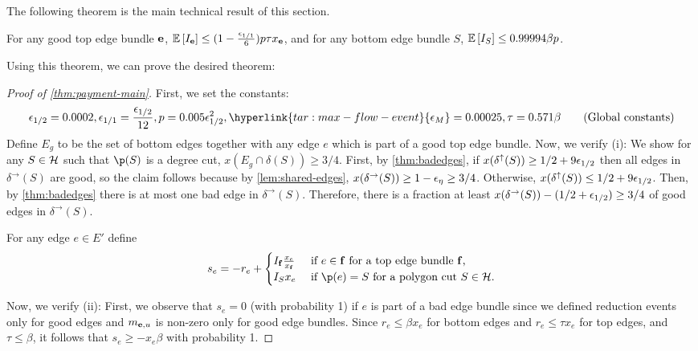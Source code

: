 The following theorem is the main technical result of this section.
\begin{theorem}\label{thm:expI}
For any good top edge bundle ${\bf e}$, 	
${\mathbb{E}}\left[I_{\bf e}\right] \le (1-\frac{{\epsilon}_{1/1}}{6})p\tau x_{\bf e}$,
and for any bottom edge bundle $S$,
${\mathbb{E}}\left[I_S\right] \le 0.99994 \beta p$.
\end{theorem}
Using this theorem, we can prove the desired theorem: 
\paymentmain*
\begin{proof}[Proof of \cref{thm:payment-main}]
First, we set the constants: 
\begin{align}\label{eq:constants}
\eps_{1/2}=0.0002, \eps_{1/1}=\frac{\eps_{1/2}}{12}, p=0.005\eps_{1/2}^2, \hyperlink{tar:max-flow-event}{\eps_M}=0.00025, \tau=0.571\beta \tag{Global constants} %
\end{align}
Define $E_g$ to be the set of bottom edges together
with any edge $e$ which is part of a good top edge bundle. Now, we verify (i): We show for any $S\in \mathcal{H}$ such that $\p(S)$ is a degree cut, $x(E_g\cap \delta(S))\geq 3/4$. 
First, by \cref{thm:badedges}, if $x(\delta^\uparrow(S))\geq 1/2+9{\epsilon}_{1/2}$ then all edges in $\delta^\rightarrow(S)$ are good, so the claim follows because by \cref{lem:shared-edges}, $x(\delta^\rightarrow(S))\geq 1-{\epsilon}_\eta\geq 3/4$. Otherwise, $x(\delta^\uparrow(S))\leq 1/2+9{\epsilon}_{1/2}$. Then, by \cref{thm:badedges} there is at most one bad edge in $\delta^\rightarrow(S)$. Therefore, there is a fraction at least $x(\delta^\rightarrow(S))-(1/2+{\epsilon}_{1/2})\geq 3/4$ of good edges in $\delta^\rightarrow(S)$.


For any edge $e\in E'$ define
\begin{equation}
	s_e = -r_e + \begin{cases}I_\bbf \frac{x_e}{x_{\bbf}} & \text{ if $e\in \bbf$ for a top edge bundle $\bbf$,}\\
	I_S x_e & \text{ if $\p(e)=S$ for a polygon cut $S\in\cH$.}
 \end{cases}
\end{equation}

Now, we verify (ii): First, we observe that $s_e=0$ (with probability 1) if $e$ is part of a bad edge bundle since  we defined reduction events only for good edges and $m_{{\bf e},u}$ is non-zero only for good edge bundles.
 Since $r_e \le \beta x_e$ for bottom edges and $r_e \le \tau x_e$ for top edges, and $\tau \le \beta$, it follows that $s_e \ge -x_e \beta$ with probability 1.


\end{proof}
